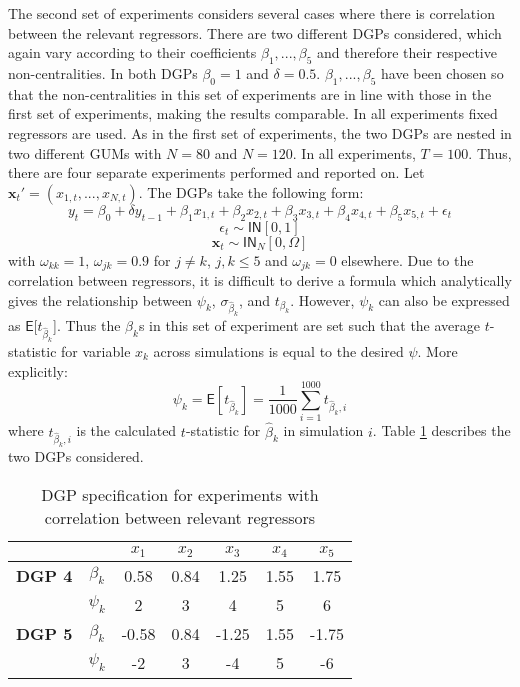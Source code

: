 The second set of experiments considers several cases where there is correlation between the relevant regressors. There are two different DGPs considered, which again vary according to their coefficients $\beta_{1},...,\beta_{5}$ and therefore their respective non-centralities. In both DGPs $\beta_{0}=1$ and $\delta = 0.5$. $\beta_{1},...,\beta_{5}$ have been chosen so that the non-centralities in this set of experiments are in line with those in the first set of experiments, making the results comparable. In all experiments fixed regressors are used. As in the first set of experiments, the two DGPs are nested in two different GUMs with $N=80$ and $N=120$. In all experiments, $T=100$. Thus, there are four separate experiments performed and reported on.   Let $\textbf{x}_{t}'=(x_{1,t},...,x_{N,t})$. The DGPs take the following form: 
$$y_{t}=\beta_{0} + \delta y_{t-1}+\beta_{1}x_{1,t}+\beta_{2}x_{2,t}+ \beta_{3}x_{3,t}+ \beta_{4}x_{4,t}+ \beta_{5}x_{5,t} + \epsilon_{t}$$
$$\epsilon_{t} \sim \mathsf{IN}[0,1] $$
 $$\textbf{x}_{t} \sim \mathsf{IN}_{N} [0,\Omega]$$
with $\omega_{kk} = 1 $, $\omega_{jk} = 0.9 $ for $j \neq k$, $j,k \leq 5$ and $\omega_{jk} = 0 $ elsewhere. Due to the correlation between regressors, it is difficult to derive a formula which analytically gives the relationship between $\psi_{k}$, $\sigma_{\widehat{\beta}_{k}}$, and $t_{\beta_{k}}$. However, $\psi_{k}$ can also be expressed as $\mathsf{E}$[$t_{\widehat{\beta}_{k}}$]. Thus the $\beta_{k}$s in this set of experiment are set such that the average $t$-statistic for variable $x_{k}$ across simulations is equal to the desired $\psi$. More explicitly:
$$\psi_{k} = \mathsf{E}[t_{\widehat{\beta}_{k}}] = \frac{1}{1000}\sum_{i=1}^{1000}t_{\widehat{\beta}_{k},i}$$
where $t_{\widehat{\beta}_{k},i}$ is the calculated $t$-statistic for $\widehat{\beta}_{k}$ in simulation $i$. Table \ref{DGPs4and5} describes the two DGPs considered.
\begin{table}[h]
\centering
\begin{tabular}{c|c|c|c|c|c|c}

&  &$x_{1}$ &$x_{2}$ &$x_{3}$ &  $x_{4}$ & $x_{5}$  \\
\hline
\textbf{DGP 4} & $\beta_{k}$  & 0.58 &0.84 &1.25 &  1.55 & 1.75 \\

 	& $\psi_{k}$ &2 &3 &4 &5 &6 \\
\hline
\textbf{DGP 5} & $\beta_{k}$  & -0.58 &0.84 &-1.25 &  1.55 &-1.75 \\

 	& $\psi_{k}$  &-2 &3 &-4 &5 &-6 \\

    
\end{tabular}
\caption{DGP specification for experiments with correlation between relevant regressors}
\label{DGPs4and5}
\end{table} 

